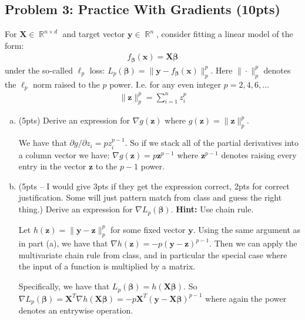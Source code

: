 \documentclass[10pt]{article}
\newcommand{\bs}[1]{\boldsymbol{#1}}
\newcommand{\bv}[1]{\mathbf{#1}}
\DeclareMathOperator{\R}{\mathbb{R}}
\begin{document}
\newpage
\subsection{Problem 3: Practice With Gradients (10pts)}
For $\bv{X} \in \R^{n\times d}$ and target vector $\bv{y} \in \R^n$, consider fitting a linear model of the form:
\begin{align*}
f_{\bs{\beta}}(\bv{x}) = \bv{X}\bs{\beta}
\end{align*}
under the so-called $\ell_p$ loss: $L_p(\bs{\beta}) = \|\bv{y} - f_{\bs{\beta}}(\bv{x})\|_p^p$. Here $\|\cdot \|_p^p$ denotes the $\ell_p$ norm raised to the $p$ power. I.e. for any even integer $p = 2,4,6, \ldots$
\begin{align*}
\|\bv{z}\|_p^p = \sum_{i=1}^n z_i^p
\end{align*}

\begin{enumerate}[(a)]
	\item (5pts)  Derive an expression for $\nabla g(\bv{z})$ where $g(\bv{z}) = \|\bv{z}\|_p^p$. 
	
	\color{blue}
	We have that $\partial g / \partial z_i = pz_i^{p-1}$. So if we stack all of the partial derivatives into a column vector we have: $\nabla g(\bv{z}) = p \bv{z}^{p-1}$ where $\bv{z}^{p-1}$ denotes raising every entry in the vector $\bv{z}$ to the $p-1$ power.
	\color{black}
	
	\item (5pts -- I would give 3pts if they get the expression correct, 2pts for correct justification. Some will just pattern match from class and guess the right thing.) Derive an expression for $\nabla L_p(\bs{\beta})$. \textbf{Hint:} Use chain rule.
	
	\color{blue}
	Let $h(\bv{z}) = \|\bv{y} - \bv{z}\|_p^p$ for some fixed vector $\bv{y}$. Using the same argument as in part (a), we have that $\nabla h(\bv{z}) = - p \left(\bv{y} - \bv{z}\right)^{p-1}$. Then we can apply the multivariate chain rule from class, and in particular the special case where the input of a function is multiplied by a matrix. 
	
	Specifically, we have that $L_p(\bs{\beta}) = h(\bv{X}\bs{\beta})$. So $\nabla L_p(\bs{\beta})  = \bv{X}^T \nabla h(\bv{X}\bs{\beta}) = -p \bv{X}^T\left(\bv{y} - \bv{X}\bs{\beta}\right)^{p-1}$ where again the power denotes an entrywise operation.
	\color{black}
\end{enumerate}

\newpage
\end{document}
